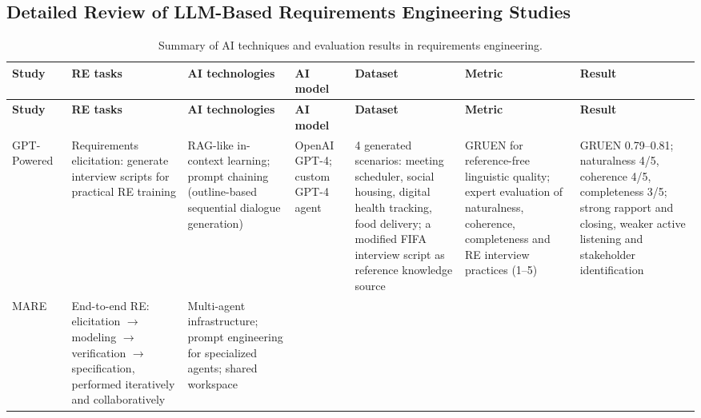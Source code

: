 \renewcommand{\appendixname}{Appendix}
\renewcommand{\appendixtocname}{Appendices}
\renewcommand{\appendixpagename}{Appendices}
\addto{}
\appendixtitleon
\appendixtitletocon
\begin{appendices}

\chapter{Detailed Review of LLM-Based Requirements Engineering Studies}
\label{apx:re-studies}

\begin{landscape}
\scriptsize
\setlength{\tabcolsep}{3pt}
\renewcommand{\arraystretch}{1.1}
\begin{longtable}{|p{2.0cm}|p{2.6cm}|p{2.6cm}|p{2.2cm}|p{4.0cm}|p{4.0cm}|p{4.4cm}|}
    \caption{Summary of AI techniques and evaluation results in requirements engineering.}
    \label{tab:apx-re-studies} \\
    \hline
    \textbf{Study} & \textbf{RE tasks} & \textbf{AI technologies} & \textbf{AI model} & \textbf{Dataset} & \textbf{Metric} & \textbf{Result} \\
    \hline
    \endfirsthead
    \hline
    \textbf{Study} & \textbf{RE tasks} & \textbf{AI technologies} & \textbf{AI model} & \textbf{Dataset} & \textbf{Metric} & \textbf{Result} \\
    \hline
    \endhead
    GPT-Powered~\cite{gorer2024gpt} &
    Requirements elicitation: generate interview scripts for practical RE training &
    RAG-like in-context learning; prompt chaining (outline-based sequential dialogue generation) &
    OpenAI GPT-4; custom GPT-4 agent &
    4 generated scenarios: meeting scheduler, social housing, digital health tracking, food delivery; a modified FIFA interview script as reference knowledge source &
    GRUEN for reference-free linguistic quality; expert evaluation of naturalness, coherence, completeness and RE interview practices (1--5) &
    GRUEN 0.79--0.81; naturalness 4/5, coherence 4/5, completeness 3/5; strong rapport and closing, weaker active listening and stakeholder identification \\
    \hline
    MARE~\cite{mare2024} &
    End-to-end RE: elicitation $\rightarrow$ modeling $\rightarrow$ verification $\rightarrow$ specification, performed iteratively and collaboratively &
    Multi-agent infrastructure; prompt engineering for specialized agents; shared workspace &

\end{longtable}
\end{landscape}
\end{appendices}

